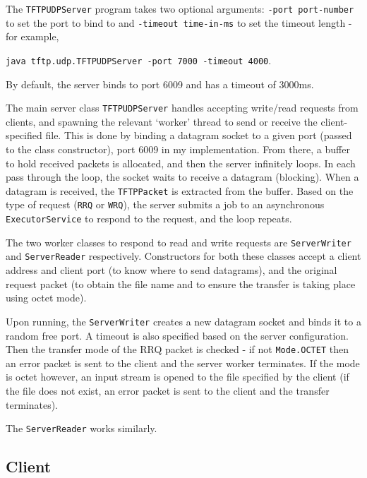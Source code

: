 \documentclass[a4paper]{article}
\newcommand{\code}{\texttt}
\begin{document}
The \code{TFTPUDPServer} program takes two optional arguments: \code{-port port-number} to set the port to bind to and \code{-timeout time-in-ms} to set the timeout length - for example,
\begin{center}
\code{java tftp.udp.TFTPUDPServer -port 7000 -timeout 4000}.
\end{center}
By default, the server binds to port 6009 and has a timeout of 3000ms.

The main server class \code{TFTPUDPServer} handles accepting write/read requests from clients, and spawning the relevant `worker' thread to send or receive the client-specified file. This is done by binding a datagram socket to a given port (passed to the class constructor), port 6009 in my implementation. From there, a buffer to hold received packets is allocated, and then the server infinitely loops. In each pass through the loop, the socket waits to receive a datagram (blocking). When a datagram is received, the \code{TFTPPacket} is extracted from the buffer. Based on the type of request (\code{RRQ} or \code{WRQ}), the server submits a job to an asynchronous \code{ExecutorService} to respond to the request, and the loop repeats.

The two worker classes to respond to read and write requests are \code{ServerWriter} and \code{ServerReader} respectively. Constructors for both these classes accept a client address and client port (to know where to send datagrams), and the original request packet (to obtain the file name and to ensure the transfer is taking place using octet mode).

Upon running, the \code{ServerWriter} creates a new datagram socket and binds it to a random free port. A timeout is also specified based on the server configuration. Then the transfer mode of the RRQ packet is checked - if not \code{Mode.OCTET} then an error packet is sent to the client and the server worker terminates. If the mode is octet however, an input stream is opened to the file specified by the client (if the file does not exist, an error packet is sent to the client and the transfer terminates).

The \code{ServerReader} works similarly.

\subsection{Client}
\end{document}
